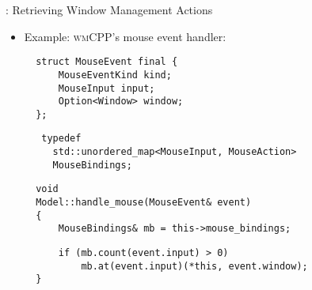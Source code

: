 \begin{frame}[fragile]{\underline{\cpp}: Retrieving Window Management Actions \hfill {\footnotesize \currentname}}


    \begin{itemize}

        \item Example: \textsc{wmCPP}'s mouse event handler:\\[3pt]
\begin{minipage}[t]{.39\linewidth}
\begin{verbatim}
  struct MouseEvent final {
      MouseEventKind kind;
      MouseInput input;
      Option<Window> window;
  };
\end{verbatim}
\end{minipage}%
\begin{minipage}[t]{.61\linewidth}
\begin{verbatim}
   typedef
     std::unordered_map<MouseInput, MouseAction>
     MouseBindings;
\end{verbatim}
\end{minipage}

\vspace*{10pt}\begin{verbatim}
  void
  Model::handle_mouse(MouseEvent& event)
  {
      MouseBindings& mb = this->mouse_bindings;
\end{verbatim}
\begin{verbatim}
      if (mb.count(event.input) > 0)
          mb.at(event.input)(*this, event.window);
  }
\end{verbatim}

    \end{itemize}

    \vfill

\end{frame}

